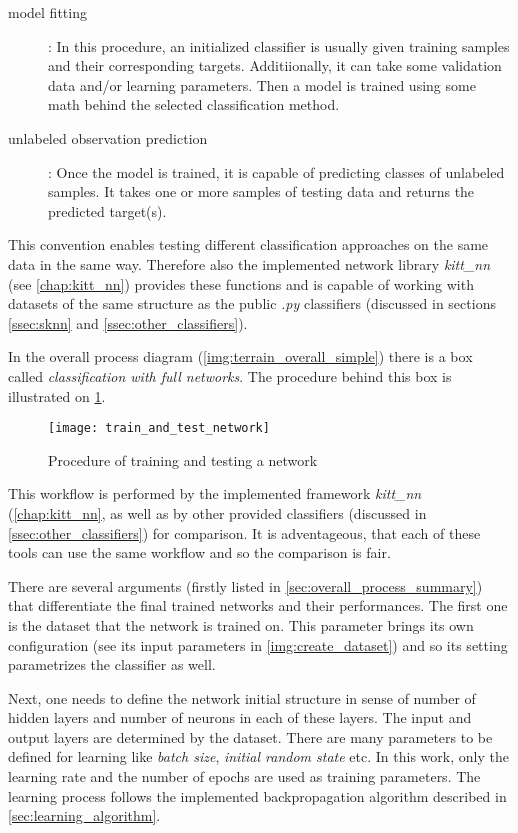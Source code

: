 \begin{description}
\item[model fitting] : In this procedure, an initialized classifier is usually given training samples and their corresponding targets. Additiionally, it can take some validation data and/or learning parameters. Then a model is trained using some math behind the selected classification method.
\item[unlabeled observation prediction] : Once the model is trained, it is capable of predicting classes of unlabeled samples. It takes one or more samples of testing data and returns the predicted target(s).
\end{description}

This convention enables testing different classification approaches on the same data in the same way. Therefore also the implemented network library \textit{kitt\_nn} (see \cref{chap:kitt_nn}) provides these functions and is capable of working with datasets of the same structure as the public \textit{.py} classifiers (discussed in sections \ref{ssec:sknn} and \ref{ssec:other_classifiers}).

In the overall process diagram (\cref{img:terrain_overall_simple}) there is a box called \textit{classification with full networks}. The procedure behind this box is illustrated on \cref{img:train_and_test_network}.

\begin{figure}[H]
  \centering
  \texttt{[image: train\_and\_test\_network]}
  \caption{Procedure of training and testing a network}
  \label{img:train_and_test_network}
\end{figure}

This workflow is performed by the implemented framework \textit{kitt\_nn} (\cref{chap:kitt_nn}, as well as by other provided classifiers (discussed in \cref{ssec:other_classifiers}) for comparison. It is adventageous, that each of these tools can use the same workflow and so the comparison is fair.

There are several arguments (firstly listed in \cref{sec:overall_process_summary}) that differentiate the final trained networks and their performances. The first one is the dataset that the network is trained on. This parameter brings its own configuration (see its input parameters in \cref{img:create_dataset}) and so its setting parametrizes the classifier as well.

Next, one needs to define the network initial structure in sense of number of hidden layers and number of neurons in each of these layers. The input and output layers are determined by the dataset. There are many parameters to be defined for learning like \textit{batch size}, \textit{initial random state} etc. In this work, only the learning rate and the number of epochs are used as training parameters. The learning process follows the implemented backpropagation algorithm described in \cref{sec:learning_algorithm}.

